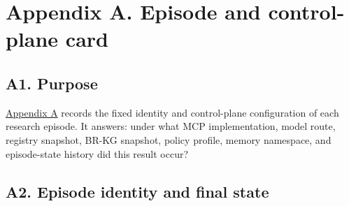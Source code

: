 \section{\texorpdfstring{\textbf{Appendix A. Episode and control-plane card}}{Appendix A. Episode and control-plane card}}\label{appendix-a.-episode-and-control-plane-card}\label{app:a}

\subsection{\texorpdfstring{\textbf{A1. Purpose}}{A1. Purpose}}\label{a1.-purpose}

\hyperref[app:a]{Appendix A} records the fixed identity and control-plane configuration of each research episode. It answers: under what MCP implementation, model route, registry snapshot, BR-KG snapshot, policy profile, memory namespace, and episode-state history did this result occur?

\subsection{\texorpdfstring{\textbf{A2. Episode identity and final state}}{A2. Episode identity and final state}}\label{a2.-episode-identity-and-final-state}


